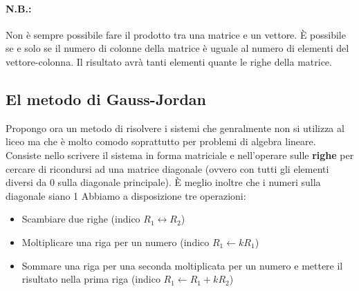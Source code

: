 \documentclass{article}     %
\begin{document}
\paragraph*{N.B.:} Non è sempre possibile fare il prodotto tra una matrice e un vettore. È possibile se e solo se il numero di colonne della matrice è uguale al numero di elementi del vettore-colonna. Il risultato avrà tanti elementi quante le righe della matrice.  
\subsection{El metodo di Gauss-Jordan}
Propongo ora un metodo di risolvere i sistemi che genralmente non si utilizza al liceo ma che è molto comodo soprattutto per problemi di algebra lineare. Consiste nello scrivere il sistema in forma matriciale e nell'operare sulle \textbf{righe} per cercare di ricondursi ad una matrice diagonale (ovvero con tutti gli elementi diversi da 0 sulla diagonale principale). È meglio inoltre che i numeri sulla diagonale siano 1 Abbiamo a disposizione tre operazioni:
\begin{itemize}
    \item Scambiare due righe (indico $R_1\leftrightarrow R_2$)
    \item Moltiplicare una riga per un numero (indico $R_1\leftarrow kR_1$)
    \item Sommare una riga per una seconda moltiplicata per un numero e mettere il risultato nella prima riga (indico $R_1\leftarrow R_1+kR_2$)
\end{itemize}
\end{document}
